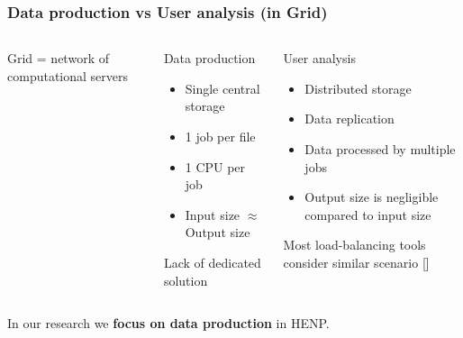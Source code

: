 \documentclass{beamer}
\begin{document}
\begin{frame}\frametitle{Data production vs User analysis (in Grid)}
\begin{columns}[c]
\begin{block}{}
Grid = network of computational servers
\end{block}

\begin{block}{Data production}
  \begin{itemize}
    \item Single central storage
    \item 1 job per file
    \item 1 CPU per job
    \item Input size $\approx$ Output size 
  \end{itemize}
  Lack of dedicated solution
\end{block}

\begin{block}{User analysis}
  \begin{itemize}
    \item Distributed storage	
    \item Data replication
	\item Data processed by multiple jobs
	\item Output size is negligible compared to input size
  \end{itemize}
  Most load-balancing tools consider similar scenario \textcolor{black}{[\cite{Globus_scheduler}]}
\end{block}

\end{columns}


\begin{block}{}
In our research we \textbf{focus on data production} in HENP.
\end{block}
\end{frame}
\end{document}
